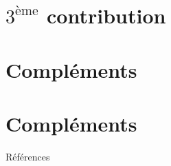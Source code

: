 \documentclass[10pt,aspectratio=169]{beamer}
\begin{document}
\section{$3^{\text{ème}}$ contribution}
  
  
  
  
  
  
  
\section{Compléments}
% 


\section*{Compléments}

\begin{frame}[allowframebreaks]{Références}
  \tiny %
  
\end{frame}


\end{document}

